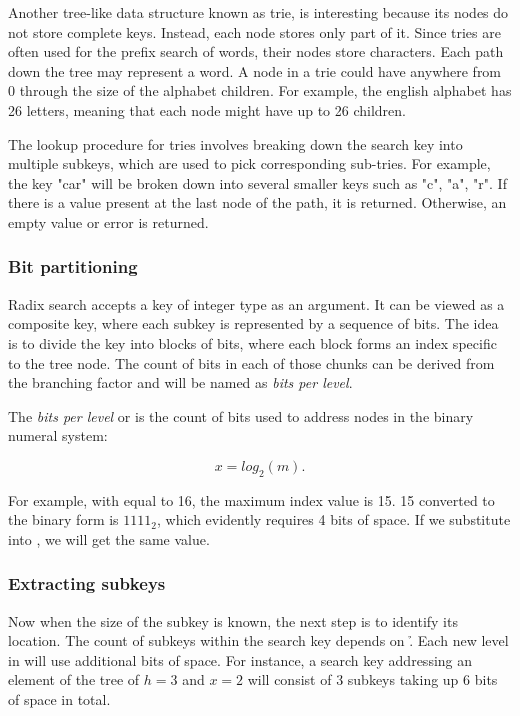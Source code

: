 Another tree-like data structure known as trie, is interesting because its nodes do not store complete keys. Instead, each node stores only part of it. Since tries are often used for the prefix search of words, their nodes store characters. Each path down the tree may represent a word. A node in a trie could have anywhere from 0 through the size of the alphabet children. For example, the english alphabet has 26 letters, meaning that each node might have up to 26 children.

The lookup procedure for tries involves breaking down the search key into multiple subkeys, which are used to pick corresponding sub-tries. For example, the key "car" will be broken down into several smaller keys such as "c", "a", "r". If there is a value present at the last node of the path, it is returned. Otherwise, an empty value or error is returned.

\subsubsection*{Bit partitioning}
Radix search accepts a key of integer type as an argument. It can be viewed as a composite key, where each subkey is represented by a sequence of bits. The idea is to divide the key into blocks of bits, where each block forms an index specific to the tree node. The count of bits in each of those chunks can be derived from the branching factor and will be named as \emph{bits per level}.

The \emph{bits per level} or \x{} is the count of bits used to address \m{} nodes in the binary numeral system:

\begin{equation}
    \label{eq:bits-per-level}
    x = log_2(m).
\end{equation}

For example, with \m{} equal to 16, the maximum index value is 15. 15 converted to the binary form is $1111_2$, which evidently requires 4 bits of space. If we substitute \m{} into , we will get the same value.

\subsubsection*{Extracting subkeys}

Now when the size of the subkey is known, the next step is to identify its location. The count of subkeys within the search key depends on \h. Each new level in \rbtree{} will use \x{} additional bits of space. For instance, a search key addressing an element of the tree of ${h = 3}$ and ${x = 2}$ will consist of 3 subkeys taking up 6 bits of space in total.

